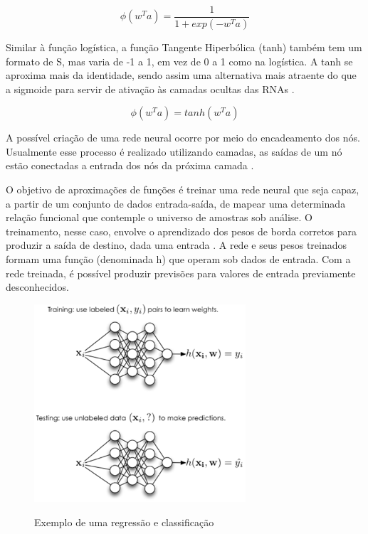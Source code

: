 \begin{equation}
\label{eq:sigmoid}
    \phi(w^Ta)=\frac{1}{1+exp(-w^Ta)} 
\end{equation}

Similar à função logística, a função Tangente Hiperbólica (tanh) também tem um formato de S, mas varia de -1 a 1, em vez de 0 a 1 como na logística. A tanh se aproxima mais da identidade, sendo assim uma alternativa mais atraente do que a sigmoide para servir de ativação às camadas ocultas das RNAs \cite{ai}.

\begin{equation}
\label{eq:tanh}
    \phi(w^Ta) = tanh(w^Ta)
\end{equation}

A possível criação de uma rede neural ocorre por meio do encadeamento dos nós. Usualmente esse processo é realizado utilizando camadas, as saídas de um nó estão conectadas a entrada dos nós da próxima camada \cite{tensor-flow}.

O objetivo de aproximações de funções é treinar uma rede neural que seja capaz, a partir de um conjunto de dados entrada-saída, de mapear uma determinada relação funcional que contemple o universo de amostras sob análise. O treinamento, nesse caso, envolve o aprendizado dos pesos de borda corretos para produzir a saída de destino, dada uma entrada \cite{uml}. A rede e seus pesos treinados formam uma função (denominada h) que operam sob dados de entrada. Com a rede treinada, é possível produzir previsões para valores de entrada previamente desconhecidos.

\begin{figure}[h]
    \caption{Exemplo de uma regressão e classificação}
    \centering
    \includegraphics[width=0.7\textwidth]{Textuais/Figuras/rede-neural.png}
    \label{fig:reg-class}
\end{figure}

